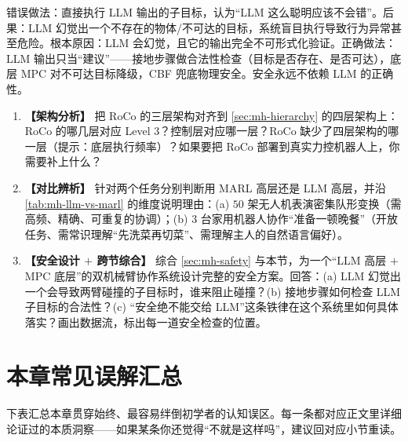 \begin{pitfall}
错误做法：直接执行 LLM 输出的子目标，认为“LLM 这么聪明应该不会错”。后果：LLM 幻觉出一个不存在的物体/不可达的目标，系统盲目执行导致行为异常甚至危险。根本原因：LLM 会幻觉，且它的输出完全不可形式化验证。正确做法：LLM 输出只当“建议”——接地步骤做合法性检查（目标是否存在、是否可达），底层 MPC 对不可达目标降级，CBF 兜底物理安全。安全永远不依赖 LLM 的正确性。
\end{pitfall}

\begin{practice}
\begin{enumerate}
  \item \textbf{【架构分析】} 把 RoCo 的三层架构对齐到 \cref{sec:mh-hierarchy} 的四层架构上：RoCo 的哪几层对应 Level 3？控制层对应哪一层？RoCo 缺少了四层架构的哪一层（提示：底层执行频率）？如果要把 RoCo 部署到真实力控机器人上，你需要补上什么？
  \item \textbf{【对比辨析】} 针对两个任务分别判断用 MARL 高层还是 LLM 高层，并沿 \cref{tab:mh-llm-vs-marl} 的维度说明理由：(a) $50$ 架无人机表演密集队形变换（需高频、精确、可重复的协调）；(b) $3$ 台家用机器人协作“准备一顿晚餐”（开放任务、需常识理解“先洗菜再切菜”、需理解主人的自然语言偏好）。
  \item \textbf{【安全设计 $+$ 跨节综合】} 综合 \cref{sec:mh-safety} 与本节，为一个“LLM 高层 $+$ MPC 底层”的双机械臂协作系统设计完整的安全方案。回答：(a) LLM 幻觉出一个会导致两臂碰撞的子目标时，谁来阻止碰撞？(b) 接地步骤如何检查 LLM 子目标的合法性？(c) “安全绝不能交给 LLM”这条铁律在这个系统里如何具体落实？画出数据流，标出每一道安全检查的位置。
\end{enumerate}
\end{practice}

\section*{本章常见误解汇总}

下表汇总本章贯穿始终、最容易绊倒初学者的认知误区。每一条都对应正文里详细论证过的本质洞察——如果某条你还觉得“不就是这样吗”，建议回对应小节重读。

